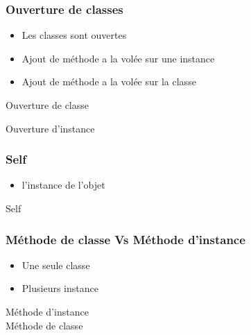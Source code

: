 \documentclass{beamer}
\begin{document}
\begin{frame}
  \frametitle{Ouverture de classes}
  \begin{itemize}
    \item Les classes sont ouvertes
    \item Ajout de m\'ethode a la vol\'ee sur une instance
    \item Ajout de m\'ethode a la vol\'ee sur la classe
  \end{itemize}
\end{frame}

\begin{frame}
  \begin{beamerboxesrounded}{Ouverture de classe}
    
  \end{beamerboxesrounded}
\end{frame}

\begin{frame}
  \begin{beamerboxesrounded}{Ouverture d'instance}
    
  \end{beamerboxesrounded}
\end{frame}

\begin{frame}
  \frametitle{Self}
  \begin{itemize}
    \item l'instance de l'objet
  \end{itemize}
\end{frame}

\begin{frame}
  \begin{beamerboxesrounded}{Self}
    
  \end{beamerboxesrounded}
\end{frame}

\begin{frame}
  \frametitle{M\'ethode de classe Vs M\'ethode d'instance}
  \begin{itemize}
    \item Une seule classe
    \item Plusieurs instance
  \end{itemize}
\end{frame}

\begin{frame}
  \begin{beamerboxesrounded}{M\'ethode d'instance \\ M\'ethode de classe}
    
  \end{beamerboxesrounded}
\end{frame}
\end{document}
